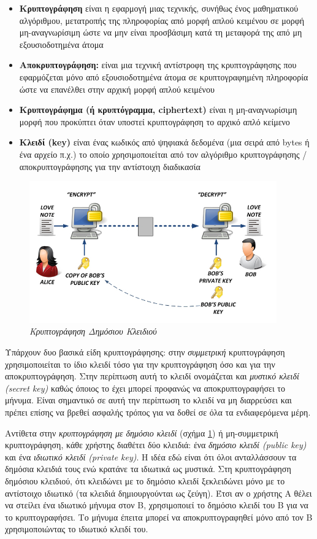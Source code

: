 \begin{itemize}
\item \textbf{Κρυπτογράφηση} είναι η εφαρμογή μιας τεχνικής, συνήθως ένος μαθηματικού αλγόριθμου, μετατροπής της πληροφορίας από μορφή απλού κειμένου σε μορφή μη-αναγνωρίσιμη ώστε να μην είναι προσβάσιμη κατά τη μεταφορά της από μη εξουσιοδοτημένα άτομα
\item \textbf{Αποκρυπτογράφηση:} είναι μια τεχνική αντίστροφη της κρυπτογράφησης που εφαρμόζεται μόνο από εξουσιοδοτημένα άτομα σε κρυπτογραφημένη πληροφορία ώστε να επανέλθει στην αρχική μορφή απλού κειμένου
\item \textbf{Κρυπτογράφημα (ή κρυπτόγραμμα, ciphertext)} είναι η μη-αναγνωρίσιμη μορφή που προκύπτει όταν υποστεί κρυπτογράφηση το αρχικό απλό κείμενο
\item \textbf{Κλειδί (key)} είναι ένας κωδικός από ψηφιακά δεδομένα (μια σειρά από bytes ή ένα αρχείο π.χ.) το οποίο χρησιμοποιείται από τον αλγόριθμο κρυπτογράφησης / αποκρυπτογράφησης για την αντίστοιχη διαδικασία
\end{itemize}

\begin{figure}[!ht]
 \centering
 \includegraphics[width=0.95\textwidth]{images/chapter8/8-2}
 \caption {\textsl{Κρυπτογράφηση Δημόσιου Κλειδιού}}
 \label{8-2}
\end{figure}

Υπάρχουν δυο βασικά είδη κρυπτογράφησης: στην \emph{συμμετρική} κρυπτογράφηση χρησιμοποιείται το ίδιο κλειδί τόσο για την κρυπτογράφηση όσο και για την αποκρυπτογράφηση. Στην περίπτωση αυτή το κλειδί ονομάζεται και \emph{μυστικό κλειδί (secret key)} καθώς όποιος το έχει μπορεί προφανώς να αποκρυπτογραφήσει το μήνυμα. Είναι σημαντικό σε αυτή την περίπτωση το κλειδί να μη διαρρεύσει και πρέπει επίσης να βρεθεί ασφαλής τρόπος για να δοθεί σε όλα τα ενδιαφερόμενα μέρη. 

Αντίθετα στην \emph{κρυπτογράφηση με δημόσιο κλειδί} (σχήμα \ref{8-2}) ή μη-συμμετρική κρυπτογράφηση, κάθε χρήστης διαθέτει δύο κλειδιά: ένα \emph{δημόσιο κλειδί (public key)} και ένα \emph{ιδιωτικό κλειδί (private key)}. Η ιδέα εδώ είναι ότι όλοι ανταλλάσσουν τα δημόσια κλειδιά τους ενώ κρατάνε τα ιδιωτικά ως μυστικά. Στη κρυπτογράφηση δημόσιου κλειδιού, ότι κλειδώνει με το δημόσιο κλειδί ξεκλειδώνει μόνο με το αντίστοιχο ιδιωτικό (τα κλειδιά δημιουργούνται ως ζεύγη). Έτσι αν ο χρήστης Α θέλει να στείλει ένα ιδιωτικό μήνυμα στον Β, χρησιμοποιεί το δημόσιο κλειδί του Β για να το κρυπτογραφήσει. Το μήνυμα έπειτα μπορεί να αποκρυπτογραφηθεί μόνο από τον Β χρησιμοποιώντας το ιδιωτικό κλειδί του.